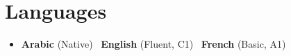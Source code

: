\section{Languages}
\begin{itemize}[leftmargin=0.15in, label={}, itemsep=4pt, topsep=4pt]
  \small
  \item \textbf{Arabic} (Native) \textbar\ \textbf{English} (Fluent, C1) \textbar\ \textbf{French} (Basic, A1)
\end{itemize}